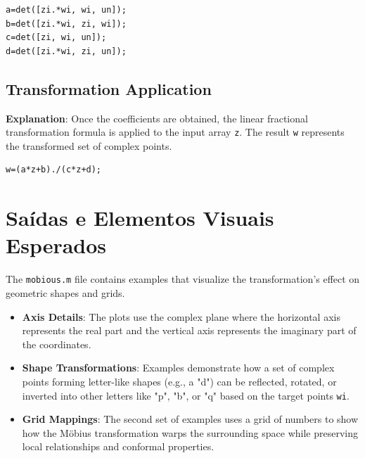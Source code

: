 \begin{lstlisting}
a=det([zi.*wi, wi, un]);
b=det([zi.*wi, zi, wi]);
c=det([zi, wi, un]);
d=det([zi.*wi, zi, un]);
\end{lstlisting}

\subsection{Transformation Application}
\textbf{Explanation}: Once the coefficients are obtained, the linear fractional transformation formula is applied to the input array \texttt{z}. The result \texttt{w} represents the transformed set of complex points.

\begin{lstlisting}
w=(a*z+b)./(c*z+d);
\end{lstlisting}

\section{Saídas e Elementos Visuais Esperados}

The \texttt{mobious.m} file contains examples that visualize the transformation's effect on geometric shapes and grids. 



\begin{itemize}
    \item \textbf{Axis Details}: The plots use the complex plane where the horizontal axis represents the real part and the vertical axis represents the imaginary part of the coordinates.
    \item \textbf{Shape Transformations}: Examples demonstrate how a set of complex points forming letter-like shapes (e.g., a "d") can be reflected, rotated, or inverted into other letters like "p", "b", or "q" based on the target points \texttt{wi}.
    \item \textbf{Grid Mappings}: The second set of examples uses a grid of numbers to show how the M\"{o}bius transformation warps the surrounding space while preserving local relationships and conformal properties.
\end{itemize}
